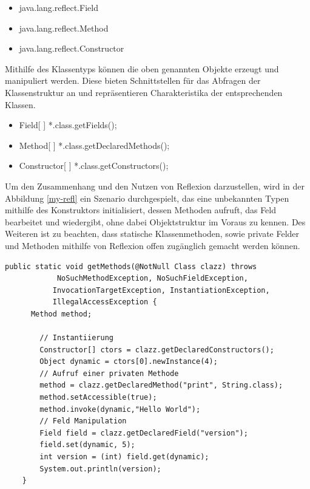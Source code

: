   \begin{itemize}
    \item java.lang.reflect.Field
    \item java.lang.reflect.Method
    \item java.lang.reflect.Constructor
  \end{itemize}

  Mithilfe des Klassentyps können die oben genannten Objekte erzeugt und manipuliert werden. Diese bieten Schnittstellen für das Abfragen der Klassenstruktur an und repräsentieren Charakteristika der entsprechenden Klassen.

  \begin{itemize}
    \item Field[ ] *.class.getFields();
    \item Method[ ] *.class.getDeclaredMethods();
    \item Constructor[ ] *.class.getConstructors();
  \end{itemize}
  \bigbreak 

  Um den Zusammenhang und den Nutzen von Reflexion darzustellen, wird in der Abbildung \ref{my-refl} ein Szenario durchgespielt, das eine unbekannten Typen mithilfe des Konstruktors initialisiert, dessen Methoden aufruft, das Feld bearbeitet und wiedergibt, ohne dabei Objektstruktur im Voraus zu kennen. Des Weiteren ist zu beachten, dass statische Klassenmethoden, sowie private Felder und Methoden mithilfe von Reflexion offen zugänglich gemacht werden können.\cite{Forman04javareflection}\bigbreak 

  \begin{lstlisting}[caption=Reflexion in Aktion,label=my-refl,captionpos=b]
    public static void getMethods(@NotNull Class clazz) throws
            NoSuchMethodException, NoSuchFieldException,
           InvocationTargetException, InstantiationException,
           IllegalAccessException {
      Method method;

        // Instantiierung
        Constructor[] ctors = clazz.getDeclaredConstructors();
        Object dynamic = ctors[0].newInstance(4);
        // Aufruf einer privaten Methode
        method = clazz.getDeclaredMethod("print", String.class);
        method.setAccessible(true);
        method.invoke(dynamic,"Hello World");
        // Feld Manipulation
        Field field = clazz.getDeclaredField("version");
        field.set(dynamic, 5);
        int version = (int) field.get(dynamic);
        System.out.println(version);
    }
  \end{lstlisting}

